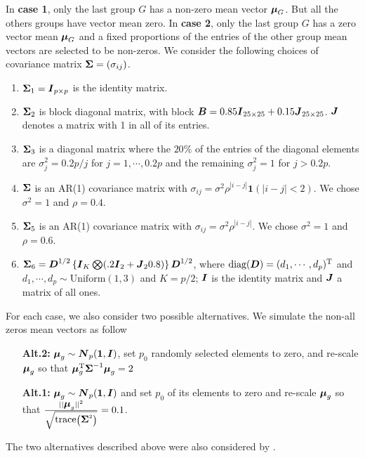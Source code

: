 \documentclass[times,sort&compress,3p]{elsarticle}
\theoremstyle{plain}%
\theoremstyle{definition}
\def\diag{\hbox{diag}}
\def\diag{\hbox{diag}}
\def\trace{\hbox{trace}}
\def\diag{\hbox{diag}}
\def\diag{\hbox{diag}}
\def\trace{\hbox{trace}}
\def\trans{^{\rm T}}
\def\bone{{\mathbf 1}}
\newcommand{\uB}       {\mbox{\boldmath$B$}}
\newcommand{\uD}       {\mbox{\boldmath$D$}}
\newcommand{\uI}       {\mbox{\boldmath$I$}}
\newcommand{\uJ}       {\mbox{\boldmath$J$}}
\newcommand{\uN}       {\mbox{\boldmath$N$}}
\newcommand{\umu}               {\mbox{\boldmath$\mu$}}
\newcommand{\uSigma}            {\mbox{\boldmath$\Sigma$}}
\begin{document}
In \textbf{case 1}, only the last group $G$ has a non-zero mean vector $\umu_G$. But all the others groups have vector mean zero. In \textbf{case 2}, only the last group $G$ has a zero vector mean $\umu_{G}$ and a fixed proportions of the entries of the other group mean vectors are selected to be non-zeros.  
We consider the following choices of covariance matrix $\uSigma=(\sigma_{ij})$.
\begin{enumerate}
  \item $\uSigma_{1} = \uI_{p \times p} $ is the identity matrix.
  \item $\uSigma_{2} $ is block diagonal matrix, with block $\uB = 0.85\uI_{25 \times 25} + 0.15\uJ_{25 \times 25}$. $\uJ$ denotes a matrix with 1 in all of its entries.
  \item $\uSigma_{3}$ is a diagonal matrix where the $20\%$ of the entries of the diagonal elements are $\sigma^2_j = 0.2p/j$ for $j = 1, \cdots, 0.2p$ and the remaining $\sigma^2_j = 1$ for $j > 0.2p$.
  \item $\uSigma$ is an AR(1) covariance matrix with $\sigma_{ij}=\sigma^2\rho^{|i - j|}\bone(|i-j| < 2)$. We chose $\sigma^2 = 1$ and $\rho = 0.4$.
  \item $\uSigma_{5}$ is an AR(1) covariance matrix with $\sigma_{ij}=\sigma^2\rho^{|i - j|}$. We chose $\sigma^2 = 1$ and $\rho = 0.6$.
  \item $\uSigma_6 = \uD^{1/2}\left\{ \uI_K \bigotimes (.2\uI_2 + \uJ_{2}0.8) \right\}\uD^{1/2}$, where $\diag(\uD)=(d_{1}, \cdots, d_{p})\trans$ and $d_{1}, \cdots, d_{p} \sim \text{Uniform}(1, 3)$ and $K = p/2$; $\uI$ is the identity matrix and $\uJ$ a matrix of all ones.
\end{enumerate}
For each case, we also consider two possible alternatives. We simulate the non-all zeros mean vectors as follow
\begin{enumerate} %
 \item[{\bf Alt.2:}]  $\umu_g \sim \uN_{p}(\bf{1}, \uI)$, set $p_0$ randomly selected elements to zero, and re-scale $\umu_g$ so that $\umu_g \trans\uSigma ^{-1}  \umu_g = 2$ 
 \item[{\bf Alt.1:}] $\umu_g \sim \uN_{p}(\bf{1}, \uI)$ and set $p_0$ of its elements to zero and re-scale $\umu_g$ so that $\frac{||\umu_{g}||^{2}}{\sqrt{\trace\left( \uSigma ^{2}\right)}} = 0.1$.
\end{enumerate}
The two alternatives described above were also considered by \citet{srivastava2014raptt,zoh2018powerful}.
\end{document}
